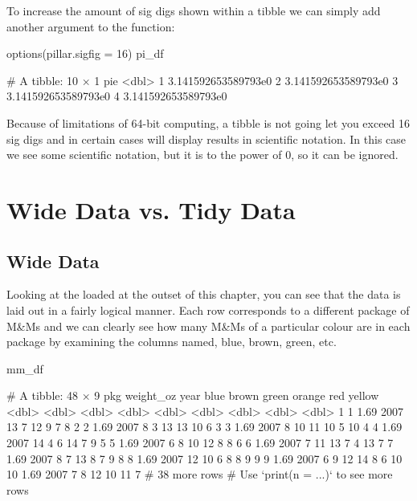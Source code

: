 To increase the amount of sig digs shown within a tibble we can simply add another argument to the  function:

\begin{inR}
options(pillar.sigfig = 16)
pi_df
\end{inR}
\begin{outR}
# A tibble: 10 × 1
                   pie
                 <dbl>
 1 3.141592653589793e0
 2 3.141592653589793e0
 3 3.141592653589793e0
 4 3.141592653589793e0
\end{outR}

Because of limitations of 64-bit computing, a tibble is not going let you exceed 16 sig digs and in certain cases will display results in scientific notation. In this case we see some scientific notation, but it is to the power of 0, so it can be ignored.

\section{Wide Data vs. Tidy Data}

\subsection{Wide Data}
\label{sec:wide_data}

Looking at the  loaded at the outset of this chapter, you can see that the data is laid out in a fairly logical manner. Each row corresponds to a different package of M\&Ms and we can clearly see how many M\&Ms of a particular colour are in each package by examining the columns named, blue, brown, green, etc.

\begin{inR}
mm_df
\end{inR}

\begin{outR}
# A tibble: 48 × 9
     pkg weight_oz  year  blue brown green orange   red yellow
   <dbl>     <dbl> <dbl> <dbl> <dbl> <dbl>  <dbl> <dbl>  <dbl>
 1     1      1.69  2007    13     7    12      9     7      8
 2     2      1.69  2007     8     3    13     13    10      6
 3     3      1.69  2007     8    10    11     10     5     10
 4     4      1.69  2007    14     4     6     14     7      9
 5     5      1.69  2007     6     8    10     12     8      8
 6     6      1.69  2007     7    11    13      7     4     13
 7     7      1.69  2007     8     7    13      8     7      9
 8     8      1.69  2007    12    10     6      8     8      9
 9     9      1.69  2007     6     9    12     14     8      6
10    10      1.69  2007     7     8    12     10    11      7
# 38 more rows
# Use `print(n = ...)` to see more rows
\end{outR}

